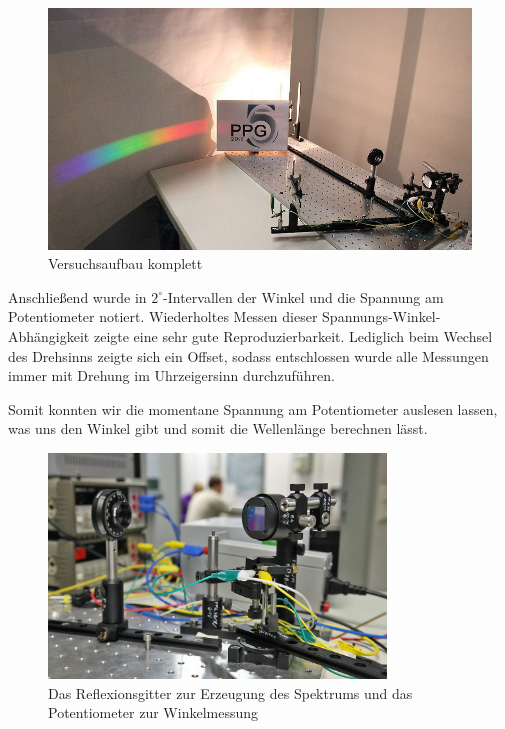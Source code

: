 \documentclass[11pt]{scrartcl}
\begin{document}
\begin{figure}[ht]
\begin{center}
\includegraphics[width=1.\textwidth]{aufbau_spektrum.jpg}
\end{center}
\vspace{-1.5\baselineskip}
\caption{Versuchsaufbau komplett}
\label{fig:aufbau_spektrum}
\end{figure}

Anschließend wurde in $2^\circ$-Intervallen der Winkel und die Spannung am Potentiometer notiert. Wiederholtes Messen dieser Spannungs-Winkel-Abhängigkeit zeigte eine sehr gute Reproduzierbarkeit. Lediglich beim Wechsel des Drehsinns zeigte sich ein Offset, sodass entschlossen wurde alle Messungen immer mit Drehung im Uhrzeigersinn durchzuführen.

Somit konnten wir die momentane Spannung am Potentiometer auslesen lassen, was uns den Winkel gibt und somit die Wellenlänge berechnen lässt.
\begin{figure}[ht]
\begin{center}
\includegraphics[width=0.8\textwidth]{poti-reflexgitter.jpg}
\end{center}
\vspace{-1.5\baselineskip}
\caption{Das Reflexionsgitter zur Erzeugung des Spektrums und das Potentiometer zur Winkelmessung}
\label{winkel_spannung}
\end{figure}
\end{document}
